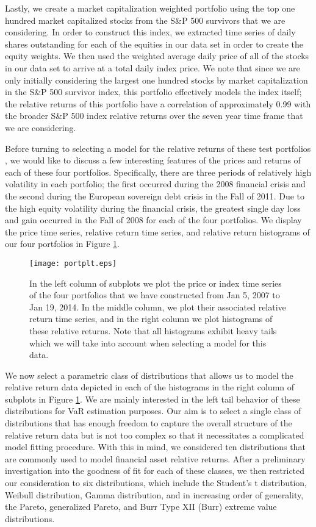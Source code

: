 \documentclass{amsart}
\begin{document}
Lastly, we create a market capitalization weighted portfolio using the top one hundred 
market capitalized stocks from the S\&P 500 survivors that we are considering.  In order to 
construct this index, we extracted time series of daily shares outstanding for each of  
the equities in our data set in order to create the equity weights.  We then used the weighted 
average daily price of all of the stocks in our data set to arrive at a total daily index price. 
We note that since we are only initially considering the 
largest one hundred stocks by market capitalization in the S\&P 500 survivor index, this portfolio 
effectively models the index itself; the relative returns of this portfolio have a correlation 
of approximately 0.99 with the broader S\&P 500 index relative returns over the seven year time 
frame that we are considering. 

Before turning to selecting a model for the relative returns of these test portfolios
, we would like to discuss a 
few interesting features of the prices and returns of  
each of these four portfolios.  Specifically, there are three periods of relatively high volatility
in each portfolio; 
the first occurred during the 2008 financial crisis and the second during the European sovereign debt 
crisis in the Fall of 2011.  Due to the high equity volatility during the financial crisis, the 
greatest single day loss and gain occurred in the Fall of 2008 for each of the four portfolios.
We display the price time series, relative return time series, and relative return histograms of our 
four portfolios in Figure \ref{portfig}.
%
\begin{figure}[h!]
    \centering
    \texttt{[image: portplt.eps]}
    \caption{In the left column of subplots we plot the price or index time series of the 
    four portfolios that we have constructed from Jan 5, 2007 to Jan 19, 2014.  In the 
    middle column, we plot their associated relative return time series, and in the right column 
    we plot histograms of these relative returns.  Note that all histograms exhibit 
    heavy tails which we will take into account when selecting a model for this data.}
    \label{portfig}
\end{figure}
%

We now select a parametric class of distributions that allows us to 
model the relative return data depicted in each of the histograms in the right column of 
subplots in Figure 
\ref{portfig}.   We are mainly interested in the left tail behavior of these 
distributions for VaR estimation purposes.  Our aim is to select a 
single class of distributions that has enough freedom to 
capture the overall structure of the relative return data but is not 
too complex so that it necessitates a complicated model fitting 
procedure.  With this in mind, we considered ten distributions that 
are commonly used to model financial asset relative returns. After a preliminary
investigation into the goodness of fit for each of these classes, 
we then restricted our consideration to six distributions, which include the  
Student's t distribution, Weibull distribution, 
Gamma distribution, and in increasing order of generality, the 
Pareto, generalized Pareto, and Burr Type XII (Burr) extreme value distributions.
\end{document}
